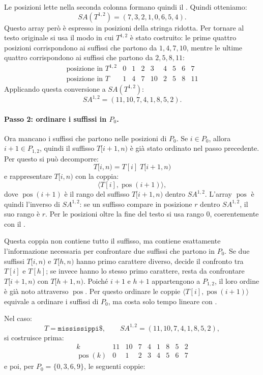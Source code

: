 \documentclass{article}
\theoremstyle{definition}
\numberwithin{equation}{section}
\begin{document}
Le posizioni lette nella seconda colonna formano quindi il . Quindi otteniamo:
\[
    SA(T^{1,2})=(7,3,2,1,0,6,5,4).
\]
Questo array però è espresso in posizioni della stringa ridotta. Per tornare al testo originale si usa il modo in cui $T^{1,2}$ è stato costruito: le prime quattro posizioni corrispondono ai suffissi che partono da $1,4,7,10$, mentre le ultime quattro corrispondono ai suffissi che partono da $2,5,8,11$:
\[
    \begin{array}{c|cccccccc}
        \text{posizione in }T^{1,2} & 0 & 1 & 2 & 3  & 4 & 5 & 6 & 7  \\ \hline
        \text{posizione in }T       & 1 & 4 & 7 & 10 & 2 & 5 & 8 & 11
    \end{array}
\]
Applicando questa conversione a $SA(T^{1,2})$:
\[
    SA^{1,2}=(11,10,7,4,1,8,5,2).
\]

\paragraph{Passo 2: ordinare i suffissi in $P_0$.}
Ora mancano i suffissi che partono nelle posizioni di $P_0$. Se $i\in P_0$, allora $i+1\in P_{1,2}$, quindi il suffisso $T[i+1,n)$ è già stato ordinato nel passo precedente. Per questo si può decomporre:
\[
    T[i,n)=T[i]\;T[i+1,n)
\]
e rappresentare $T[i,n)$ con la coppia:
\[
    \langle T[i],\operatorname{pos}(i+1)\rangle,
\]
dove $\operatorname{pos}(i+1)$ è il rango del suffisso $T[i+1,n)$ dentro $SA^{1,2}$. L'array $\operatorname{pos}$ è quindi l'inverso di $SA^{1,2}$: se un suffisso compare in posizione $r$ dentro $SA^{1,2}$, il suo rango è $r$. Per le posizioni oltre la fine del testo si usa rango $0$, coerentemente con il .

Questa coppia non contiene tutto il suffisso, ma contiene esattamente l'informazione necessaria per confrontare due suffissi che partono in $P_0$. Se due suffissi $T[i,n)$ e $T[h,n)$ hanno primo carattere diverso, decide il confronto tra $T[i]$ e $T[h]$; se invece hanno lo stesso primo carattere, resta da confrontare $T[i+1,n)$ con $T[h+1,n)$. Poiché $i+1$ e $h+1$ appartengono a $P_{1,2}$, il loro ordine è già noto attraverso $\operatorname{pos}$. Per questo ordinare le coppie $\langle T[i],\operatorname{pos}(i+1)\rangle$ equivale a ordinare i suffissi di $P_0$, ma costa solo tempo lineare con .

Nel caso:
\[
    T=\texttt{mississippi\$},
    \qquad
    SA^{1,2}=(11,10,7,4,1,8,5,2),
\]
si costruisce prima:
\[
    \begin{array}{c|cccccccc}
        k                     & 11 & 10 & 7 & 4 & 1 & 8 & 5 & 2 \\ \hline
        \operatorname{pos}(k) & 0  & 1  & 2 & 3 & 4 & 5 & 6 & 7
    \end{array}
\]
e poi, per $P_0=\{0,3,6,9\}$, le seguenti coppie:
\end{document}
